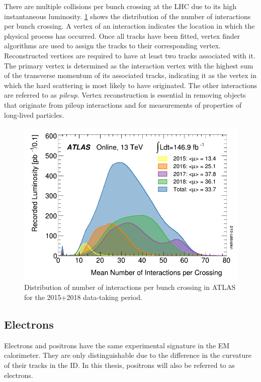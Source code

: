 There are multiple \protonproton collisions per bunch crossing at the LHC due to its high instantaneous luminosity. \cref{fig:method:ATLAS-pileup} shows the distribution of the number of interactions per bunch crossing. A vertex of an interaction indicates the location in which the physical process has occurred. Once all tracks have been fitted, vertex finder algorithms are used to assign the tracks to their corresponding vertex. Reconstructed vertices are required to have at least two tracks associated with it. The primary vertex is determined as the \protonproton interaction vertex with the highest sum of the transverse momentum of its associated tracks, indicating it as the vertex in which the hard scattering is most likely to have originated. The other \protonproton interactions are referred to as \emph{pileup}. Vertex reconstruction is essential in removing objects that originate from pileup interactions and for measurements of properties of long-lived particles. 
\begin{figure}[]
    \centering
    \includegraphics[width=\mediumfigwidth]{images/mu_2015_2018.png}
    \caption[Distribution of number of interactions per \protonproton bunch crossing in ATLAS for the 2015+2018 data-taking period]{Distribution of number of interactions per \protonproton bunch crossing in ATLAS for the 2015+2018 data-taking period.~\cite{ATLAS:lumiPlots}}
    \label{fig:method:ATLAS-pileup}
\end{figure}

\subsection{Electrons}\label{sec:reconstruction:electrons}
Electrons and positrons have the same experimental signature in the EM calorimeter. They are only distinguishable due to the difference in the curvature of their tracks in the ID. In this thesis, positrons will also be referred to as electrons.   

